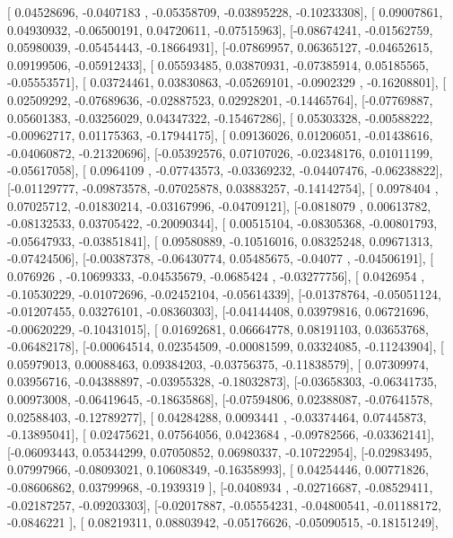 \documentclass{article}
\begin{document}
       [ 0.04528696, -0.0407183 , -0.05358709, -0.03895228, -0.10233308],
       [ 0.09007861,  0.04930932, -0.06500191,  0.04720611, -0.07515963],
       [-0.08674241, -0.01562759,  0.05980039, -0.05454443, -0.18664931],
       [-0.07869957,  0.06365127, -0.04652615,  0.09199506, -0.05912433],
       [ 0.05593485,  0.03870931, -0.07385914,  0.05185565, -0.05553571],
       [ 0.03724461,  0.03830863, -0.05269101, -0.0902329 , -0.16208801],
       [ 0.02509292, -0.07689636, -0.02887523,  0.02928201, -0.14465764],
       [-0.07769887,  0.05601383, -0.03256029,  0.04347322, -0.15467286],
       [ 0.05303328, -0.00588222, -0.00962717,  0.01175363, -0.17944175],
       [ 0.09136026,  0.01206051, -0.01438616, -0.04060872, -0.21320696],
       [-0.05392576,  0.07107026, -0.02348176,  0.01011199, -0.05617058],
       [ 0.0964109 , -0.07743573, -0.03369232, -0.04407476, -0.06238822],
       [-0.01129777, -0.09873578, -0.07025878,  0.03883257, -0.14142754],
       [ 0.0978404 ,  0.07025712, -0.01830214, -0.03167996, -0.04709121],
       [-0.0818079 ,  0.00613782, -0.08132533,  0.03705422, -0.20090344],
       [ 0.00515104, -0.08305368, -0.00801793, -0.05647933, -0.03851841],
       [ 0.09580889, -0.10516016,  0.08325248,  0.09671313, -0.07424506],
       [-0.00387378, -0.06430774,  0.05485675, -0.04077   , -0.04506191],
       [ 0.076926  , -0.10699333, -0.04535679, -0.0685424 , -0.03277756],
       [ 0.0426954 , -0.10530229, -0.01072696, -0.02452104, -0.05614339],
       [-0.01378764, -0.05051124, -0.01207455,  0.03276101, -0.08360303],
       [-0.04144408,  0.03979816,  0.06721696, -0.00620229, -0.10431015],
       [ 0.01692681,  0.06664778,  0.08191103,  0.03653768, -0.06482178],
       [-0.00064514,  0.02354509, -0.00081599,  0.03324085, -0.11243904],
       [ 0.05979013,  0.00088463,  0.09384203, -0.03756375, -0.11838579],
       [ 0.07309974,  0.03956716, -0.04388897, -0.03955328, -0.18032873],
       [-0.03658303, -0.06341735,  0.00973008, -0.06419645, -0.18635868],
       [-0.07594806,  0.02388087, -0.07641578,  0.02588403, -0.12789277],
       [ 0.04284288,  0.0093441 , -0.03374464,  0.07445873, -0.13895041],
       [ 0.02475621,  0.07564056,  0.0423684 , -0.09782566, -0.03362141],
       [-0.06093443,  0.05344299,  0.07050852,  0.06980337, -0.10722954],
       [-0.02983495,  0.07997966, -0.08093021,  0.10608349, -0.16358993],
       [ 0.04254446,  0.00771826, -0.08606862,  0.03799968, -0.1939319 ],
       [-0.0408934 , -0.02716687, -0.08529411, -0.02187257, -0.09203303],
       [-0.02017887, -0.05554231, -0.04800541, -0.01188172, -0.0846221 ],
       [ 0.08219311,  0.08803942, -0.05176626, -0.05090515, -0.18151249],
\end{document}
